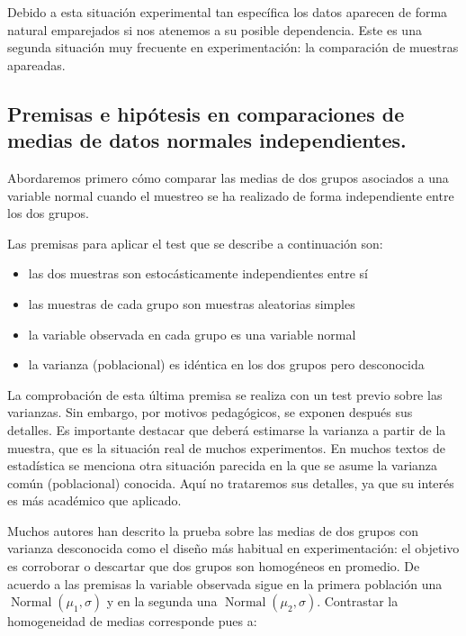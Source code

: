 \documentclass[
]{article}
\providecommand{\tightlist}{%
  \setlength{\itemsep}{0pt}\setlength{\parskip}{0pt}}
\begin{document}
Debido a esta situación experimental tan específica los datos aparecen de forma natural emparejados si nos atenemos a su posible dependencia. Este es una segunda situación muy frecuente en experimentación: la comparación de muestras apareadas.

\subsection{Premisas e hipótesis en comparaciones de medias de datos normales independientes.}\label{premisas-e-hipuxf3tesis-en-comparaciones-de-medias-de-datos-normales-independientes.}

Abordaremos primero cómo comparar las medias de dos grupos asociados a una variable normal cuando el muestreo se ha realizado de forma independiente entre los dos grupos.

Las premisas para aplicar el test que se describe a continuación son:

\begin{itemize}
\tightlist
\item
  las dos muestras son estocásticamente independientes entre sí
\item
  las muestras de cada grupo son muestras aleatorias simples
\item
  la variable observada en cada grupo es una variable normal
\item
  la varianza (poblacional) es idéntica en los dos grupos pero desconocida
\end{itemize}

La comprobación de esta última premisa se realiza con un test previo sobre las varianzas. Sin embargo, por motivos pedagógicos, se exponen después sus detalles. Es importante destacar que deberá estimarse la varianza a partir de la muestra, que es la situación real de muchos experimentos. En muchos textos de estadística se menciona otra situación parecida en la que se asume la varianza común (poblacional) conocida. Aquí no trataremos sus detalles, ya que su interés es más académico que aplicado.

Muchos autores han descrito la prueba sobre las medias de dos grupos con varianza desconocida como el diseño más habitual en experimentación: el objetivo es corroborar o descartar que dos grupos son homogéneos en promedio. De acuerdo a las premisas la variable observada sigue en la primera población una \(\operatorname{Normal}\left(\mu_{1}, \sigma\right)\) y en la segunda una \(\operatorname{Normal}\left(\mu_{2}, \sigma\right)\). Contrastar la homogeneidad de medias corresponde pues a:
\end{document}
